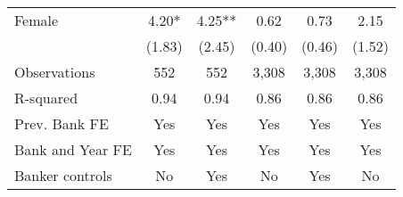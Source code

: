 {\begin{tabular*}{\hsize}{@{\hskip\tabcolsep\extracolsep\fill}l*{5}{c}}
Female        &     4.20*  &     4.25** &     0.62   &     0.73   &     2.15   \\
                &   (1.83)   &   (2.45)   &   (0.40)   &   (0.46)   &   (1.52)   \\
\midrule
Observations    &      552   &      552   &    3,308   &    3,308   &    3,308   \\
R-squared       &     0.94   &     0.94   &     0.86   &     0.86   &     0.86   \\
\midrule Prev. Bank FE   &      Yes   &      Yes   &      Yes   &      Yes   &      Yes   \\
Bank and Year FE&      Yes   &      Yes   &      Yes   &      Yes   &      Yes   \\
Banker controls &       No   &      Yes   &       No   &      Yes   &       No   \\
\bottomrule
\end{tabular*}
}
